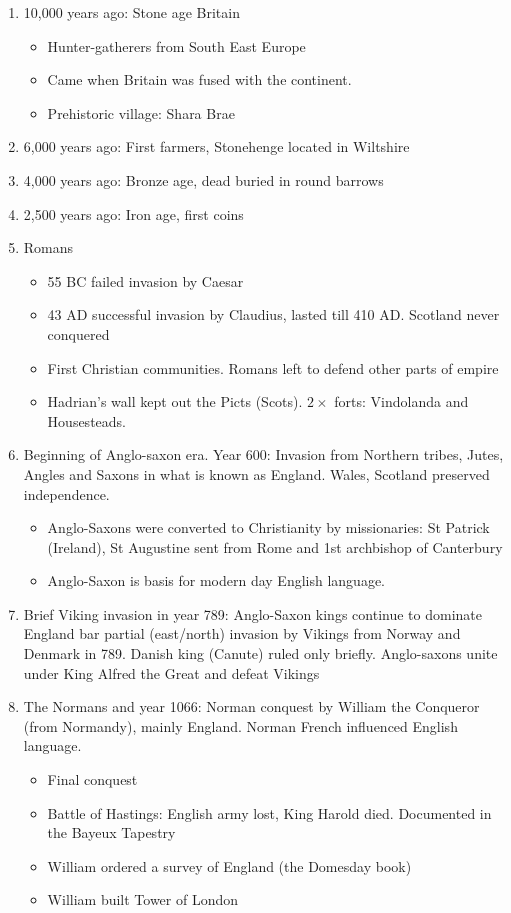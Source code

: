 \documentclass{amsart}
\begin{document}
\begin{enumerate}
\item 10,000 years ago: Stone age Britain
	\begin{itemize}
		\item Hunter-gatherers from South East Europe
		\item Came when Britain was fused with the continent. 
		\item Prehistoric village: Shara Brae
	\end{itemize}
	\item 6,000 years ago: First farmers, Stonehenge located in Wiltshire 
	\item 4,000 years ago: Bronze age, dead buried in round barrows
	\item 2,500 years ago: Iron age, first coins
	\item Romans
		\begin{itemize}
			\item 55 BC failed invasion by Caesar
			\item 43 AD successful invasion by Claudius, lasted till 410 AD. Scotland never conquered
			\item First Christian communities. Romans left to defend other parts of empire
			\item Hadrian's wall kept out the Picts (Scots). $2 \times$ forts: Vindolanda and Housesteads.		
		\end{itemize}
	\item Beginning of Anglo-saxon era. Year 600: Invasion from Northern tribes, Jutes, Angles and Saxons in what is known as England. Wales, Scotland preserved independence. 
		\begin{itemize}
			\item Anglo-Saxons were converted to Christianity by missionaries: St Patrick (Ireland), St Augustine sent from Rome and 1st archbishop of Canterbury
			\item Anglo-Saxon is basis for modern day English language.
		\end{itemize}
	\item Brief Viking invasion in year 789: Anglo-Saxon kings continue to dominate England bar partial (east/north) invasion by Vikings from Norway and Denmark in 789.  Danish king (Canute) ruled only briefly. Anglo-saxons unite under King Alfred the Great and defeat Vikings
	\item The Normans and year 1066: Norman conquest by William the Conqueror (from Normandy), mainly England. Norman French influenced English language.
		\begin{itemize}
		\item Final conquest
		\item Battle of Hastings: English army lost, King Harold died. Documented in the Bayeux Tapestry
		\item William ordered a survey of England (the Domesday book)
		\item William built Tower of London
		\end{itemize}
\end{enumerate}
\end{document}
